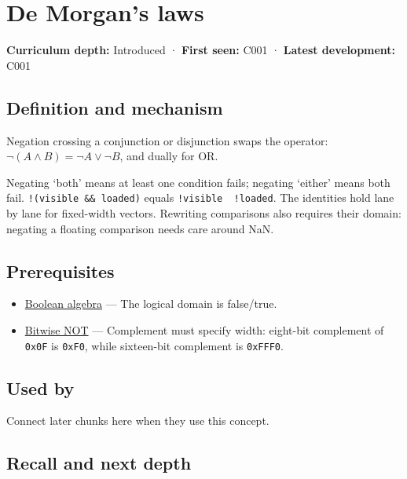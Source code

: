 \hypertarget{appendix-9079d3659da4}{}\label{referencestart:appendix-9079d3659da4}
\section{De Morgan's laws}\label{appendix-9079d3659da4-de-morgans-laws}

\textbf{Curriculum depth:} Introduced · \textbf{First seen:} C001 · \textbf{Latest development:} C001

\subsection{Definition and mechanism}\label{appendix-9079d3659da4-definition-and-mechanism}

Negation crossing a conjunction or disjunction swaps the operator: \(\neg(A\land B)=\neg A\lor\neg B\), and dually for OR.

Negating `both' means at least one condition fails; negating `either' means both fail. \texttt{!(visible\ \&\&\ loaded)} equals \texttt{!visible\ \textbar{}\textbar{}\ !loaded}. The identities hold lane by lane for fixed-width vectors. Rewriting comparisons also requires their domain: negating a floating comparison needs care around NaN.

\subsection{Prerequisites}\label{appendix-9079d3659da4-prerequisites}

\begin{itemize}
\tightlist
\item
  \hyperref[appendix-24475e1596a8]{Boolean algebra} --- The logical domain is false/true.
\item
  \hyperref[appendix-8f38927cfc54]{Bitwise NOT} --- Complement must specify width: eight-bit complement of \texttt{0x0F} is \texttt{0xF0}, while sixteen-bit complement is \texttt{0xFFF0}.
\end{itemize}

\subsection{Used by}\label{appendix-9079d3659da4-used-by}

Connect later chunks here when they use this concept.

\subsection{Recall and next depth}\label{appendix-9079d3659da4-recall-and-next-depth}


